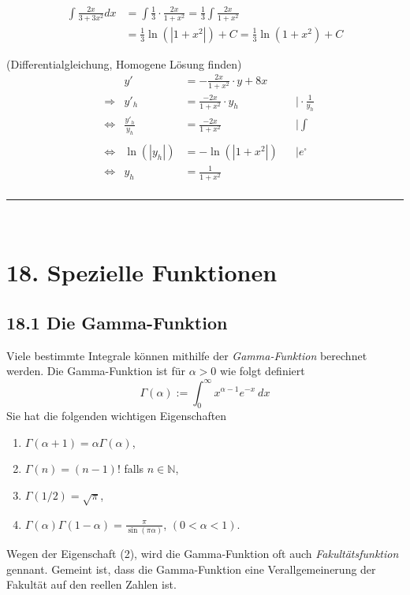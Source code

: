 \documentclass[a4paper,landscape,8pt]{extarticle}
\newcommand{\N}{\mathbb{N}}
\newcommand{\abs}[1]{\left\lvert #1 \right\rvert}
\newcommand{\sep}{\vspace{5pt}\noindent\hrule\vspace{5pt}}
\renewcommand*{\newpage}{ \ }
\begin{document}
\begin{multicols*}{4}
\begin{warmup}
\Bsp
\begin{align*}
\int \frac{2x}{3+3x^2} dx 
&= \int \frac{1}{3}\cdot \frac{2x}{1+x^2}
= \frac{1}{3}\int \frac{2x}{1+x^2}\\
&= \frac{1}{3}\ln(\abs{1+x^2}) + C
= \frac{1}{3}\ln(1+x^2) + C
\end{align*}

\Bsp (Differentialgleichung, Homogene Lösung finden)
\begin{align*}
& &y' &= -\frac{2x}{1+x^2}\cdot y + 8x\\
&\Longrightarrow &y'_h &= \frac{-2x}{1+x^2}\cdot y_h && \vert
\cdot\frac{1}{y_h}\\
&\Longleftrightarrow &\frac{y'_h}{y_h} &= \frac{-2x}{1+x^2} && \vert \int\\
\\
&\Longleftrightarrow &\ln(\abs{y_h}) &= -\ln(\abs{1+x^2}) && \vert e^\square\\
&\Longleftrightarrow &y_h &= \frac{1}{1+x^2}\\
\end{align*}

\sep
\end{warmup}

\newpage

\section{18. Spezielle Funktionen}

\subsection{18.1 Die Gamma-Funktion}


\Def Viele bestimmte Integrale können mithilfe der \emph{Gamma-Funktion}
berechnet werden. Die Gamma-Funktion ist für $\alpha > 0$ wie folgt definiert
\[
\Gamma(\alpha) := \int_0^\infty x^{\alpha-1}e^{-x} \ dx
\]
Sie hat die folgenden wichtigen Eigenschaften
\begin{enumerate}[label=(\arabic*)]
  \item $\Gamma(\alpha+1)=\alpha\Gamma(\alpha)$,
  \item $\Gamma(n)=(n-1)!$ falls $n\in \N$,
  \item $\Gamma(1/2)=\sqrt{\pi}$,
  \item $\Gamma(\alpha)\Gamma(1-\alpha)=\frac{\pi}{\sin(\pi\alpha)}$,
  $(0<\alpha<1)$.
\end{enumerate}

Wegen der Eigenschaft (2), wird die Gamma-Funktion oft auch
\emph{Fakultätsfunktion} gennant. Gemeint ist, dass die Gamma-Funktion eine
Verallgemeinerung der Fakultät auf den reellen Zahlen ist.


\end{multicols*}
\end{document}
